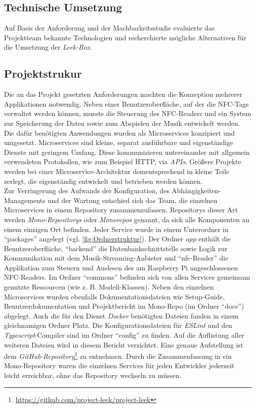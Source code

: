 \documentclass[10pt, a4paper]{article}
\begin{document}
\begin{onehalfspace}
\section{Technische Umsetzung}
  Auf Basis der Anforderung und der Machbarkeitsstudie evaluierte das Projektteam bekannte Technologien und recherchierte mögliche Alternativen für die Umsetzung der \textit{Leek-Box}.
  \subsection{Projektstrukur}
  Die an das Projekt gesetzten Anforderungen machten die Konzeption mehrerer Applikationen notwendig. Neben einer Benutzeroberfläche, auf der die NFC-Tags
  verwaltet werden können, musste die Steuerung des NFC-Readers und ein System zur Speicherung der Daten sowie zum Abspielen der Musik entwickelt werden.
  Die dafür benötigten Anwendungen wurden als Microservices konzipiert und umgesetzt.
  Microservices sind kleine, separat ausführbare und eigenständige Dienste mit geringem Umfang.
  Diese kommunizieren untereinander mit allgemein verwendeten Protokollen, wie zum Beispiel HTTP, via \textit{APIs}.
  Größere Projekte werden bei einer Microservice-Architektur dementsprechend in kleine Teile zerlegt,
   die eigenständig entwickelt und betrieben werden können. \cite{Microservices}\\
  Zur Verringerung des Aufwands der Konfiguration, des Abhängigkeiten-Managements und der Wartung entschied sich das Team, die einzelnen Microservices in einem Repository zusammenzufassen. \cite{Monorepo}
  Repositorys dieser Art werden \textit{Mono-Repositorys} oder \textit{Monorepos} genannt, da sich alle Komponenten an einem einzigen Ort befinden.
  Jeder Service wurde in einem Unterordner in \enquote{packages} angelegt (vgl. \autoref{fig:Ordnerstruktur}). Der Ordner \textit{app} enthält die Benutzeroberfläche,
  \enquote{backend} die Datenbankschnittstelle sowie Logik zur Kommunikation mit dem Musik-Streaming-Anbieter und \enquote{nfc-Reader} die Applikation zum Steuern und Auslesen des am Raspberry Pi angeschlossenen NFC-Readers.
  Im Ordner \enquote{commons} befinden sich von allen Services gemeinsam genutzte Ressourcen (wie z. B. Modell-Klassen).
  Neben den einzelnen Microservices wurden ebenfalls Dokumentationsdateien wie Setup-Guide, Benutzerdokumentation und Projektbericht im Mono-Repo (im Ordner \enquote{docs}) abgelegt.
  Auch die für den Dienst \textit{Docker} benötigten Dateien fanden in einem gleichnamigen Ordner Platz. Die Konfigurationsdateien für \textit{ESLint} und den \textit{Typescript}-Compiler sind im Ordner \enquote{config} zu finden.
  Auf die Auflistung aller weiteren Dateien wird in diesem Bericht verzichtet. Eine genaue Aufstellung ist dem \textit{GitHub-Repository}\footnote{\url{https://github.com/project-leek/project-leek}} zu entnehmen.
  Durch die Zusammenfassung in ein Mono-Repository waren die einzelnen Services für jeden Entwickler jederzeit leicht erreichbar, ohne das Repository wechseln zu müssen.


\end{onehalfspace}
\end{document}

